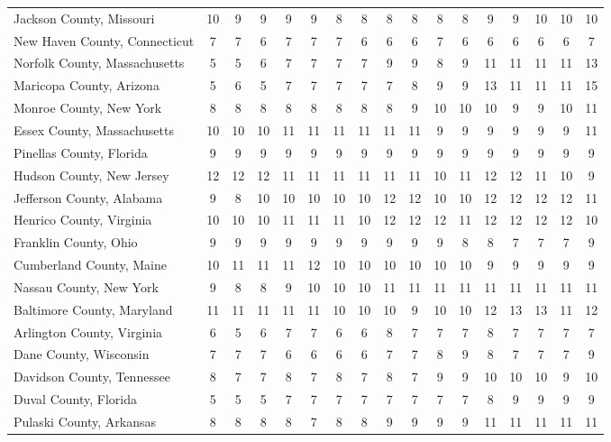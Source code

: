 \begin{landscape}
\begin{longtable}{lcccccccccccccccc}
	Jackson County, Missouri & 10 & 9 & 9 & 9 & 9 & 8 & 8 & 8 & 8 & 8 & 8 & 9 & 9 & 10 & 10 & 10 \\
	New Haven County, Connecticut & 7 & 7 & 6 & 7 & 7 & 7 & 6 & 6 & 6 & 7 & 6 & 6 & 6 & 6 & 6 & 7 \\
	Norfolk County, Massachusetts & 5 & 5 & 6 & 7 & 7 & 7 & 7 & 9 & 9 & 8 & 9 & 11 & 11 & 11 & 11 & 13 \\
	Maricopa County, Arizona & 5 & 6 & 5 & 7 & 7 & 7 & 7 & 7 & 8 & 9 & 9 & 13 & 11 & 11 & 11 & 15 \\
	Monroe County, New York & 8 & 8 & 8 & 8 & 8 & 8 & 8 & 8 & 9 & 10 & 10 & 10 & 9 & 9 & 10 & 11 \\
	Essex County, Massachusetts & 10 & 10 & 10 & 11 & 11 & 11 & 11 & 11 & 11 & 9 & 9 & 9 & 9 & 9 & 9 & 11 \\
	Pinellas County, Florida & 9 & 9 & 9 & 9 & 9 & 9 & 9 & 9 & 9 & 9 & 9 & 9 & 9 & 9 & 9 & 9 \\
	Hudson County, New Jersey & 12 & 12 & 12 & 11 & 11 & 11 & 11 & 11 & 11 & 10 & 11 & 12 & 12 & 11 & 10 & 9 \\
	Jefferson County, Alabama & 9 & 8 & 10 & 10 & 10 & 10 & 10 & 12 & 12 & 10 & 10 & 12 & 12 & 12 & 12 & 11 \\
	Henrico County, Virginia & 10 & 10 & 10 & 11 & 11 & 11 & 10 & 12 & 12 & 12 & 11 & 12 & 12 & 12 & 12 & 10 \\
	Franklin County, Ohio & 9 & 9 & 9 & 9 & 9 & 9 & 9 & 9 & 9 & 9 & 8 & 8 & 7 & 7 & 7 & 9 \\
	Cumberland County, Maine & 10 & 11 & 11 & 11 & 12 & 10 & 10 & 10 & 10 & 10 & 10 & 9 & 9 & 9 & 9 & 9 \\
	Nassau County, New York & 9 & 8 & 8 & 9 & 10 & 10 & 10 & 11 & 11 & 11 & 11 & 11 & 11 & 11 & 11 & 11 \\
	Baltimore County, Maryland & 11 & 11 & 11 & 11 & 11 & 10 & 10 & 10 & 9 & 10 & 10 & 12 & 13 & 13 & 11 & 12 \\
	Arlington County, Virginia & 6 & 5 & 6 & 7 & 7 & 6 & 6 & 8 & 7 & 7 & 7 & 8 & 7 & 7 & 7 & 7 \\
	Dane County, Wisconsin & 7 & 7 & 7 & 6 & 6 & 6 & 6 & 7 & 7 & 8 & 9 & 8 & 7 & 7 & 7 & 9 \\
	Davidson County, Tennessee & 8 & 7 & 7 & 8 & 7 & 8 & 7 & 8 & 7 & 9 & 9 & 10 & 10 & 10 & 9 & 10 \\
	Duval County, Florida & 5 & 5 & 5 & 7 & 7 & 7 & 7 & 7 & 7 & 7 & 7 & 8 & 9 & 9 & 9 & 9 \\
	Pulaski County, Arkansas & 8 & 8 & 8 & 8 & 7 & 8 & 8 & 9 & 9 & 9 & 9 & 11 & 11 & 11 & 11 & 11 \\

\end{longtable}
\end{landscape}
